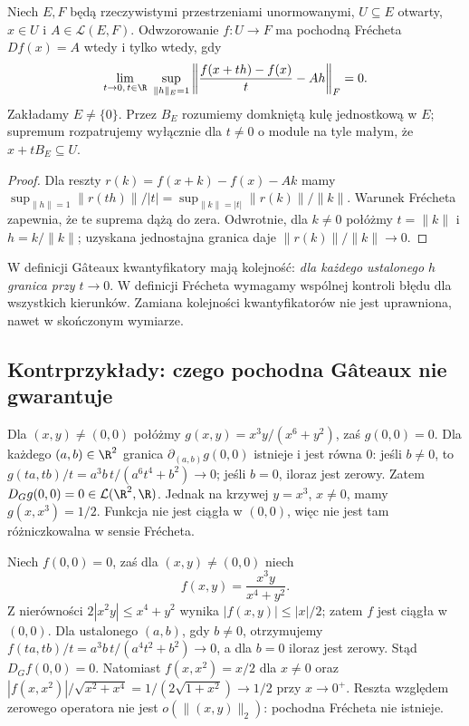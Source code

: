 \begin{stwierdzenie}
\label{prop:uniform-directions14}
Niech $E,F$ będą rzeczywistymi przestrzeniami unormowanymi, $U\subseteq E$ otwarty, $x\in U$ i $A\in\mathcal L(E,F)$. Odwzorowanie $f:U\to F$ ma pochodną Frécheta $Df(x)=A$ wtedy i tylko wtedy, gdy
\[
\lim_{t\to0,\,t\in\R}\ \sup_{\|h\|_E=1}
\left\|\frac{f(x+th)-f(x)}{t}-Ah\right\|_F=0.
\]
Zakładamy $E\ne\{0\}$. Przez $B_E$ rozumiemy domkniętą kulę jednostkową w $E$; supremum rozpatrujemy wyłącznie dla $t\ne0$ o module na tyle małym, że $x+tB_E\subseteq U$.
\end{stwierdzenie}
\begin{proof}
Dla reszty $r(k)=f(x+k)-f(x)-Ak$ mamy
$\sup_{\|h\|=1}\|r(th)\|/|t|=\sup_{\|k\|=|t|}\|r(k)\|/\|k\|$.
Warunek Frécheta zapewnia, że te suprema dążą do zera. Odwrotnie, dla $k\ne0$ połóżmy $t=\|k\|$ i $h=k/\|k\|$; uzyskana jednostajna granica daje $\|r(k)\|/\|k\|\to0$.
\end{proof}

\begin{uwaga}
\label{rem:quantifiers14}
W definicji Gâteaux kwantyfikatory mają kolejność: \emph{dla każdego ustalonego $h$ granica przy $t\to0$}. W definicji Frécheta wymagamy wspólnej kontroli błędu dla wszystkich kierunków. Zamiana kolejności kwantyfikatorów nie jest uprawniona, nawet w skończonym wymiarze.
\end{uwaga}

\subsection{Kontrprzykłady: czego pochodna Gâteaux nie gwarantuje}

\begin{przyklad}
\label{ex:directional-discontinuous14}
Dla $(x,y)\ne(0,0)$ połóżmy
$g(x,y)=x^3y/(x^6+y^2)$, zaś $g(0,0)=0$. Dla każdego $(a,b)\in\R^2$ granica $\partial_{(a,b)}g(0,0)$ istnieje i jest równa $0$: jeśli $b\ne0$, to $g(ta,tb)/t=a^3b\,t/(a^6t^4+b^2)\to0$; jeśli $b=0$, iloraz jest zerowy. Zatem $D_Gg(0,0)=0\in\mathcal L(\R^2,\R)$. Jednak na krzywej $y=x^3$, $x\ne0$, mamy $g(x,x^3)=1/2$. Funkcja nie jest ciągła w $(0,0)$, więc nie jest tam różniczkowalna w sensie Frécheta.
\end{przyklad}

\begin{przyklad}
\label{ex:continuous-gateaux-not-frechet14}
Niech $f(0,0)=0$, zaś dla $(x,y)\ne(0,0)$ niech
\[
f(x,y)=\frac{x^3y}{x^4+y^2}.
\]
Z nierówności $2|x^2y|\le x^4+y^2$ wynika $|f(x,y)|\le|x|/2$; zatem $f$ jest ciągła w $(0,0)$. Dla ustalonego $(a,b)$, gdy $b\ne0$, otrzymujemy
$f(ta,tb)/t=a^3b\,t/(a^4t^2+b^2)\to0$, a dla $b=0$ iloraz jest zerowy. Stąd $D_Gf(0,0)=0$. Natomiast $f(x,x^2)=x/2$ dla $x\ne0$ oraz
$|f(x,x^2)|/\sqrt{x^2+x^4}=1/(2\sqrt{1+x^2})\to1/2$ przy $x\to0^+$. Reszta względem zerowego operatora nie jest $o(\|(x,y)\|_2)$: pochodna Frécheta nie istnieje.
\end{przyklad}


